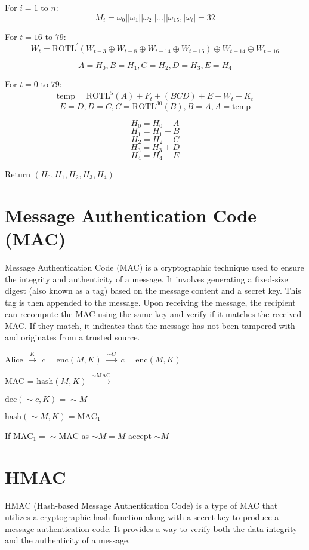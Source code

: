 \documentclass[11pt]{article}
\begin{document}
For \( i = 1 \) to \( n \):
\[ M_i = \omega_0 || \omega_1 || \omega_2 || ... || \omega_{15}, |\omega_i| = 32 \]

For \( t = 16 \) to \( 79 \):
\[ W_t = \text{ROTL}^{\prime}(W_{t-3} \oplus W_{t-8} \oplus W_{t-14} \oplus W_{t-16}) \oplus W_{t-14} \oplus W_{t-16} \]

\[ A = H_0, B = H_1, C = H_2, D = H_3, E = H_4 \]

For \( t = 0 \) to \( 79 \):
\[ \text{temp} = \text{ROTL}^5(A) + F_t + (BCD) + E + W_t + K_t \]
\[ E = D, D = C, C = \text{ROTL}^{30}(B), B = A, A = \text{temp} \]

\[ H_0 = H_0 + A \]
\[ H_1 = H_1 + B \]
\[ H_2 = H_2 + C \]
\[ H_3 = H_3 + D \]
\[ H_4 = H_4 + E \]

Return \( (H_0, H_1, H_2, H_3, H_4) \)

\section{Message Authentication Code (MAC)}

Message Authentication Code (MAC) is a cryptographic technique used to ensure the integrity and authenticity of a message. It involves generating a fixed-size digest (also known as a tag) based on the message content and a secret key. This tag is then appended to the message. Upon receiving the message, the recipient can recompute the MAC using the same key and verify if it matches the received MAC. If they match, it indicates that the message has not been tampered with and originates from a trusted source.

Alice \( \xrightarrow{K} \) \( c = \text{enc}(M, K) \) \( \xrightarrow{\sim C} \) \( c = \text{enc}(M, K) \)

MAC = \( \text{hash}(M, K) \) \( \xrightarrow{\sim \text{MAC}} \)

\( \text{dec}(\sim c, K) = \sim M \)

\( \text{hash}(\sim M, K) = \text{MAC}_1 \)

If \( \text{MAC}_1 = \sim \text{MAC} \) as \( \sim M = M \) accept \( \sim M \)

\section{HMAC}

HMAC (Hash-based Message Authentication Code) is a type of MAC that utilizes a cryptographic hash function along with a secret key to produce a message authentication code. It provides a way to verify both the data integrity and the authenticity of a message.
\end{document}
